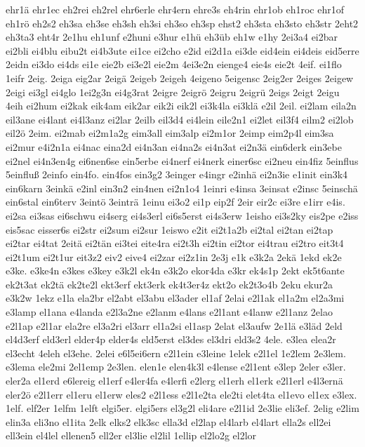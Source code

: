 {ehr1ä
ehr1ec
eh2rei
eh2rel
ehr6erle
ehr4ern
ehre3s
eh4rin
ehr1ob
eh1roc
ehr1of
eh1rö
eh2s2
eh3sa
eh3se
eh3sh
eh3si
eh3so
eh3sp
ehst2
eh3sta
eh3sto
eh3str
2eht2
eh3ta3
eht4r
2e1hu
eh1unf
e2huni
e3hur
e1hü
eh3üb
eh1w
e1hy
2ei3a4
ei2bar
ei2bli
ei4blu
eibu2t
ei4b3ute
ei1ce
ei2cho
e2id
ei2d1a
ei3de
eid4ein
ei4deis
eid5erre
2eidn
ei3do
ei4ds
ei1e
eie2b
ei3e2l
eie2m
4ei3e2n
eienge4
eie4s
eie2t
4eif.
ei1flo
1eifr
2eig.
2eiga
eig2ar
2eigä
2eigeb
2eigeh
4eigeno
5eigensc
2eig2er
2eiges
2eigew
2eigi
ei3gl
ei4glo
1ei2g3n
ei4g3rat
2eigre
2eigrö
2eigru
2eigrü
2eigs
2eigt
2eigu
4eih
ei2hum
ei2kak
eik4am
eik2ar
eik2i
eik2l
ei3k4la
ei3klä
e2il
2eil.
ei2lam
eila2n
eil3ane
ei4lant
ei4l3anz
ei2lar
2eilb
eil3d4
ei4lein
eile2n1
ei2let
eil3f4
eilm2
ei2lob
eil2ö
2eim.
ei2mab
ei2m1a2g
eim3all
eim3alp
ei2m1or
2eimp
eim2p4l
eim3sa
ei2mur
e4i2n1a
ei4nac
eina2d
ei4n3an
ei4na2s
ei4n3at
ei2n3ä
ein6derk
ein3ebe
ei2nel
ei4n3en4g
ei6nen6se
ein5erbe
ei4nerf
ei4nerk
einer6sc
ei2neu
ein4fiz
5einflus
5einfluß
2einfo
ein4fo.
ein4fos
ein3g2
3einger
e4ingr
e2inhä
ei2n3ie
e1init
ein3k4
ein6karn
3einkä
e2inl
ein3n2
ein4nen
ei2n1o4
1einri
e4insa
3einsat
e2insc
5einschä
ein6stal
ein6terv
3eintö
3einträ
1einu
ei3o2
ei1p
eip2f
2eir
eir2c
ei3re
e1irr
e4is.
ei2sa
ei3sas
ei6schwu
ei4serg
ei4s3erl
ei6s5erst
ei4s3erw
1eisho
ei3s2ky
eis2pe
e2iss
eis5sac
eisser6s
ei2str
ei2sum
ei2sur
1eiswo
e2it
ei2t1a2b
ei2tal
ei2tan
ei2tap
ei2tar
ei4tat
2eitä
ei2tän
ei3tei
eite4ra
ei2t3h
ei2tin
ei2tor
ei4trau
ei2tro
eit3t4
ei2t1um
ei2t1ur
eit3z2
eiv2
eive4
ei2zar
ei2z1in
2e3j
e1k
e3k2a
2ekä
1ekd
ek2e
e3ke.
e3ke4n
e3kes
e3key
e3k2l
ek4n
e3k2o
ekor4da
e3kr
ek4s1p
2ekt
ek5t6ante
ek2t3at
ek2tä
ek2te2l
ekt3erf
ekt3erk
ek4t3er4z
ekt2o
ek2t3o4b
2eku
ekur2a
e3k2w
1ekz
e1la
ela2br
el2abt
el3abu
el3ader
el1af
2elai
e2l1ak
el1a2m
el2a3mi
e3lamp
el1ana
e4landa
e2l3a2ne
e2lanm
e4lans
e2l1ant
e4lanw
e2l1anz
2elao
e2l1ap
e2l1ar
ela2re
el3a2ri
el3arr
el1a2si
el1asp
2elat
el3aufw
2e1lä
e3läd
2eld
el4d3erf
eld3erl
elder4p
elder4s
eld5erst
el3des
el3dri
eld3s2
4ele.
e3lea
elea2r
el3echt
4eleh
el3ehe.
2elei
e6l5ei6ern
e2l1ein
e3leine
1elek
e2l1el
1e2lem
2e3lem.
e3lema
ele2mi
2el1emp
2e3len.
elen1e
elen4k3l
e4lense
e2l1ent
e3lep
2eler
e3ler.
eler2a
el1erd
e6lereig
el1erf
e4ler4fa
e4lerfi
e2lerg
el1erh
el1erk
e2l1erl
e4l3ernä
eler2ö
e2l1err
el1eru
el1erw
eles2
e2l1ess
e2l1e2ta
ele2ti
elet4ta
el1evo
el1ex
e3lex.
1elf.
elf2er
1elfm
1elft
elgi5er.
elgi5ers
el3g2l
eli4are
e2l1id
2e3lie
eli3ef.
2elig
e2lim
elin3a
eli3no
el1ita
2elk
elks2
elk3sc
ella3d
el2lap
el4larb
el4lart
ella2s
ell2ei
ell3ein
el4lel
ellenen5
ell2er
el3lie
el2lil
1ellip
el2lo2g
el2lor
}
